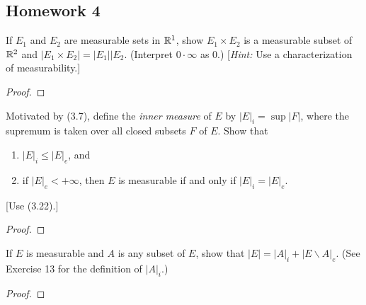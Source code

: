 \subsection{Homework 4}

\begin{problem}
If $E_1$ and $E_2$ are measurable sets in $\mathbb{R}^1$, show $E_1\times E_2$ is
a measurable subset of $\mathbb{R}^2$ and $|E_1\times E_2|=|E_1||E_2$. (Interpret
$0\cdot\infty$ as $0$.) [\emph{Hint:} Use a characterization of
measurability.]
\end{problem}
\begin{proof}
\end{proof}

\begin{problem}
Motivated by (3.7), define the \emph{inner measure} of $E$ by
$|E|_i=\sup|F|$, where the supremum is taken over all closed subsets $F$ of
$E$. Show that
\begin{enumerate}[label=(\roman*)]
\item $|E|_i\leq|E|_e$, and
\item if $|E|_e<+\infty$, then $E$ is measurable if and only if
  $|E|_i=|E|_e$.
\end{enumerate}
[Use (3.22).]
\end{problem}
\begin{proof}
\end{proof}

\begin{problem}
If $E$ is measurable and $A$ is any subset of $E$, show that
$|E|=|A|_i+|E\smallsetminus A|_e$. (See Exercise 13 for
the definition of $|A|_i$.)
\end{problem}
\begin{proof}
\end{proof}

